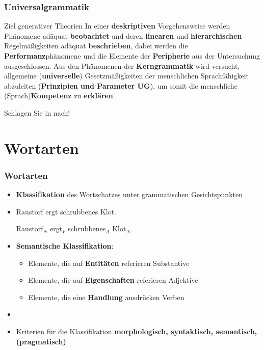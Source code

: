 \begin{frame}
\frametitle{Universalgrammatik}

\begin{block}{Ziel generativer Theorien}
In einer \textbf{deskriptiven} Vorgehensweise werden Phänomene adäquat \textbf{beobachtet} und deren \textbf{linearen} und \textbf{hierarchischen} Regelmäßigkeiten adäquat \textbf{beschrieben}, dabei werden die \textbf{Performanz}phänomene und die Elemente der \textbf{Peripherie} aus der Untersuchung ausgeschlossen. Aus den Phänomenen der \textbf{Kerngrammatik} wird versucht, allgemeine (\textbf{universelle}) Gesetzmäßigkeiten der menschlichen Sprachfähigkeit abzuleiten (\textbf{Prinzipien und Parameter \ras UG}), um somit die menschliche (Sprach)\textbf{Kompetenz} zu \textbf{erklären}.
\end{block}

Schlagen Sie  in \citet{Glueck05a} nach!

\end{frame}


\section{Wortarten}


\begin{frame}
\frametitle{Wortarten}

\begin{itemize}
	\item \textbf{Klassifikation} des Wortschatzes unter grammatischen Gesichtspunkten 
	\item[]

\pause	

	\ea Raustorf ergt schrubbenes Klot.
	\z

\pause

	\ea Raustorf$_N$ ergt$_V$ schrubbenes$_A$ Klot$_N$.
	\z
	
\pause
	\item \textbf{Semantische Klassifikation}:
	\begin{itemize}
		\item Elemente, die auf \textbf{Entitäten} referieren \ras Substantive
		\item Elemente, die auf \textbf{Eigenschaften} referieren \ras Adjektive
		\item Elemente, die eine \textbf{Handlung} ausdrücken \ras Verben

	\end{itemize}

\pause
	\item[]
	\item Kriterien für die Klassifikation \ras \textbf{morphologisch, syntaktisch, semantisch, (pragmatisch)}
	
\end{itemize}

\end{frame}


